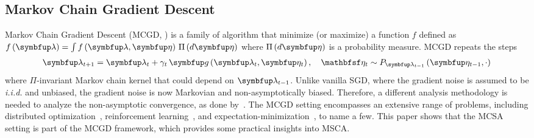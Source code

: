 \subsection{Markov Chain Gradient Descent}\label{section:mcgd}
Markov Chain Gradient Descent (MCGD, \citealt{duchi_ergodic_2012, NEURIPS2018_1371bcce}) is a family of algorithm that minimize (or maximize) a function \(f\) defined as \(f\left(\vlambda\right) = \int f\left(\vlambda, \veta\right) \, \Pi\left(d\veta\right)\) where \(\Pi\left(d\veta\right)\) is a probability measure.
MCGD repeats the steps 
{%
\begin{align}
  \vlambda_{t+1}    = \vlambda_{t} + \gamma_t \, \vg\left(\vlambda_t, \veta_{t}\right),\quad 
  \rvveta_{t}  \sim P_{\vlambda_{t-1}}\left( \veta_{t-1}, \cdot \right)\label{eq:mcgd}
\end{align}
}%
where \(\Pi\)-invariant Markov chain kernel that could depend on \(\vlambda_{t-1}\).
Unlike vanilla SGD, where the gradient noise is assumed to be \textit{i.i.d.} and unbiased, the gradient noise is now Markovian and non-asymptotically biased.
Therefore, a different analysis methodology is needed to analyze the non-asymptotic convergence, as done by~\citet{duchi_ergodic_2012, pmlr-v99-karimi19a, doan_convergence_2020, Xiong_Xu_Liang_Zhang_2021}.
The MCGD setting encompasses an extensive range of problems, including distributed optimization~\citep{ram_incremental_2009}, reinforcement learning~\citep{tadic_asymptotic_2017, doan_convergence_2020, Xiong_Xu_Liang_Zhang_2021}, and expectation-minimization~\citep{pmlr-v99-karimi19a}, to name a few.
This paper shows that the MCSA setting is part of the MCGD framework, which provides some practical insights into MSCA.

